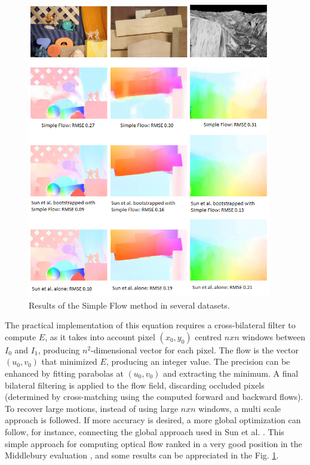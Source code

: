    \begin{figure}[tbhp]
      \centering
      \includegraphics[width=0.95\textwidth]{../images/simpleoptflow.png}
      \caption{  Results of the Simple Flow method in several datasets. }
      \label{simple_of}
   \end{figure}

The practical implementation of this equation requires a cross-bilateral filter to compute $E$, as it takes into account 
pixel $(x_0,y_0)$ centred $nxn$ windows between $I_0$ and $I_1$, producing $n^2$-dimensional vector for each pixel. 
The flow is the vector $(u_0, v_0)$ that minimized $E$, producing an integer value. The precision can be enhanced by fitting 
parabolas at  $(u_0, v_0)$ and extracting the minimum. A final bilateral filtering is applied to the flow field, discarding 
occluded pixels (determined by cross-matching using the computed forward and backward flows). 
To recover large motions, instead of using large $nxn$ windows, a multi scale approach is followed. 
If more accuracy is desired, a more global optimization can follow, for instance, connecting the global approach used in Sun et al. \cite{c40}.
This simple approach for computing optical flow ranked in a very good position in the Middlebury evaluation \cite{c17}, 
and some results can be appreciated in the Fig. \ref{simple_of}.

